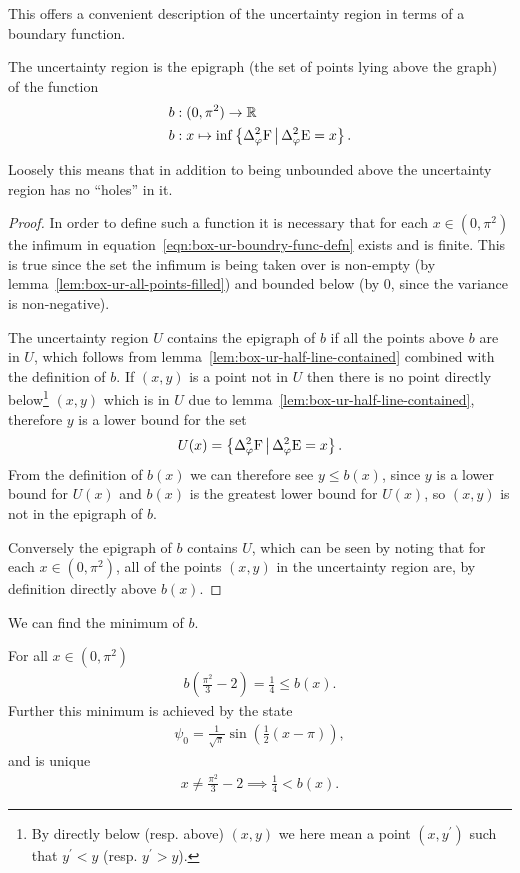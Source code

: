 This offers a convenient description of the uncertainty region in terms of a boundary function.
\begin{lem}
  The uncertainty region is the epigraph (the set of points lying above the graph) of the function
  \begin{align}
    b&:(0,\pi^2) \to \R\\
    b&:x\mapsto \inf\left\{\var[\varphi]{\opf}\,\middle|\,\var[\varphi]{\ope} = x\right\}.\label{eqn:box-ur-boundry-func-defn}
  \end{align}
\end{lem}
Loosely this means that in addition to being unbounded above the uncertainty region has no ``holes'' in it.
\begin{proof}
  In order to define such a function it is necessary that for each $x\in (0,\pi^2)$ the infimum in equation~\eqref{eqn:box-ur-boundry-func-defn} exists and is finite. This is true since the set the infimum is being taken over is non-empty (by lemma~\ref{lem:box-ur-all-points-filled}) and bounded below (by $0$, since the variance is non-negative). 

The uncertainty region $U$ contains the epigraph of $b$ if all the points above $b$ are in $U$, which follows from lemma~\ref{lem:box-ur-half-line-contained} combined with the definition of $b$. If $(x,y)$ is a point not in $U$ then there is no point directly below\footnote{By directly below (resp. above) $(x,y)$ we here mean a point $(x,y^\prime)$ such that $y^\prime < y$ (resp. $y^\prime > y$).} $(x,y)$ which is in $U$ due to lemma~\ref{lem:box-ur-half-line-contained}, therefore $y$ is a lower bound for the set
\begin{align}
  U(x) = \left\{\var[\varphi]{\opf}\,\middle|\,\var[\varphi]{\ope} = x\right\}.
\end{align}
From the definition of $b(x)$ we can therefore see $y \leq b(x)$, since $y$ is a lower bound for $U(x)$ and $b(x)$ is the greatest lower bound for $U(x)$, so $(x,y)$ is not in the epigraph of $b$. 

Conversely the epigraph of $b$ contains $U$, which can be seen by noting that for each $x\in (0,\pi^2)$, all of the points $(x,y)$ in the uncertainty region are, by definition directly above $b(x)$.
\end{proof}
We can find the minimum of $b$. 
\begin{lem}
  For all $x\in (0,\pi^2)$
  \begin{align}
    b\left(\frac{\pi^2}{3} - 2\right) = \frac{1}{4} \leq b(x).
  \end{align}
  Further this minimum is achieved by the state
  \begin{align}
     \psi_0 = \frac{1}{\sqrt{\pi}}\sin\left(\frac{1}{2}(x-\pi)\right),
  \end{align}
  and is unique
  \begin{align}
    x\neq\frac{\pi^2}{3} - 2 \implies \frac{1}{4} < b(x).
  \end{align}
\end{lem}
